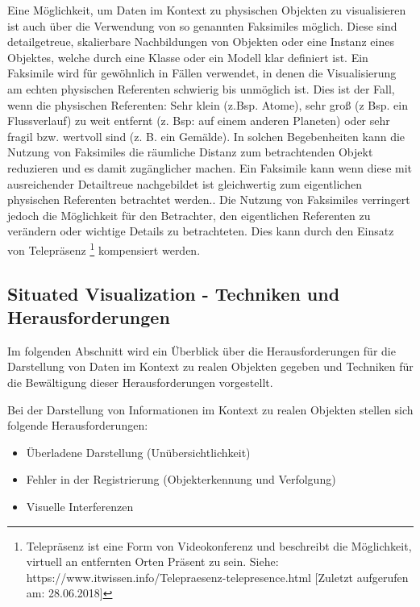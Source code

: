 \cite{Willett2017}Eine Möglichkeit, um Daten im Kontext zu physischen Objekten zu visualisieren ist auch über die Verwendung von so genannten Faksimiles möglich. Diese sind detailgetreue, skalierbare Nachbildungen von Objekten oder eine Instanz eines Objektes, welche durch eine Klasse oder ein Modell klar definiert ist. Ein Faksimile wird für gewöhnlich in Fällen verwendet, in denen die Visualisierung am echten physischen Referenten
schwierig bis unmöglich ist. Dies ist der Fall, wenn die physischen Referenten: Sehr klein (z.Bsp. Atome), sehr groß (z Bsp. ein Flussverlauf) zu weit entfernt (z. Bsp: auf einem anderen Planeten) oder sehr fragil bzw. wertvoll sind (z. B. ein Gemälde). 
In solchen Begebenheiten kann die Nutzung von Faksimiles die räumliche Distanz zum betrachtenden Objekt reduzieren und es damit zugänglicher machen. Ein Faksimile kann wenn diese mit ausreichender Detailtreue nachgebildet ist gleichwertig zum eigentlichen physischen Referenten betrachtet werden.. Die Nutzung von Faksimiles verringert jedoch die Möglichkeit für den Betrachter, den eigentlichen Referenten zu verändern oder wichtige Details zu betrachteten. Dies kann durch den Einsatz von Telepräsenz \footnote{Telepräsenz ist eine Form von Videokonferenz und beschreibt die Möglichkeit, virtuell an entfernten Orten Präsent zu sein. Siehe: https://www.itwissen.info/Telepraesenz-telepresence.html [Zuletzt aufgerufen am: 28.06.2018]} kompensiert werden. 


\subsection{Situated Visualization - Techniken und Herausforderungen}

Im folgenden Abschnitt wird ein Überblick über die Herausforderungen für die Darstellung von Daten im Kontext zu realen Objekten 
gegeben und Techniken für die Bewältigung dieser Herausforderungen vorgestellt.

\cite{DieterSchmalstieg2016} Bei der Darstellung von Informationen im Kontext zu realen Objekten stellen sich folgende Herausforderungen:

\begin{itemize}
	\item Überladene Darstellung (Unübersichtlichkeit)
	\item Fehler in der Registrierung (Objekterkennung und Verfolgung)
	\item Visuelle Interferenzen
\end{itemize}


